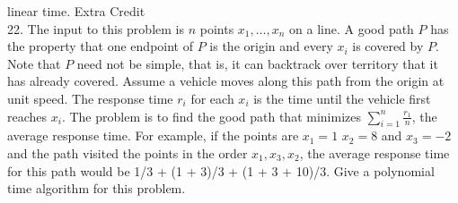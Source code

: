 \documentclass[10pt]{article}
\begin{document}
linear time.
\newpage
Extra Credit\\
	22. The input to this problem is $n$ points $x_1, \ldots, x_n$ on a line. A good path $P$ has the property that one
endpoint of $P$ is the origin and every $x_i$ is covered by $P$. Note that $P$ need not be simple, that is, it
can backtrack over territory that it has already covered. Assume a vehicle moves along this path from
the origin at unit speed. The response time $r_i$ for each $x_i$ is the time until the vehicle first reaches
$x_i$. The problem is to find the good path that minimizes $\sum_{i=1}^{n}\frac{r_1}{n}$, the average response time. For
example, if the points are $x_1 = 1$ $x_2 = 8$ and $x_3 = -2$ and the path visited the points in the order
$x_1, x_3, x_2$, the average response time for this path would be 1/3 + (1 + 3)/3 + (1 + 3 + 10)/3. Give a
polynomial time algorithm for this problem.
\end{document}
